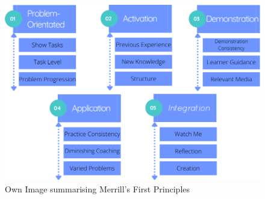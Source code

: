 \begin{figure}[H]
\centering
\centerline{\includegraphics[scale=0.6]{Figures/merrill2.png}}
\caption{Own Image summarising Merrill's First Principles}
\end{figure}


